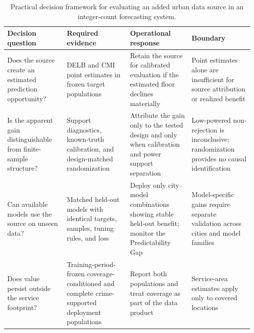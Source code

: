 \begin{table}[!htbp]
\caption{Practical decision framework for evaluating an added urban data
source in an integer-count forecasting system.}
\label{tab:practical_decision_framework}
\centering
\setlength{\tabcolsep}{3.5pt}
\begin{tabularx}{\textwidth}{
>{\RaggedRight\arraybackslash}p{2.75cm}
>{\RaggedRight\arraybackslash}X
>{\RaggedRight\arraybackslash}X
>{\RaggedRight\arraybackslash}p{3.15cm}}
\toprule
\textbf{Decision question} & \textbf{Required evidence} &
\textbf{Operational response} & \textbf{Boundary}\\
\midrule
Does the source create an estimated prediction opportunity? &
DELB and CMI point estimates in frozen target populations &
Retain the source for calibrated evaluation if the estimated floor
declines materially & Point estimates alone are insufficient for
source attribution or realized benefit\\
Is the apparent gain distinguishable from finite-sample structure? &
Support diagnostics, known-truth calibration, and design-matched
randomization & Attribute the gain only to the tested design and only when
calibration and power support separation & Low-powered non-rejection is
inconclusive; randomization provides no causal identification\\
Can available models use the source on unseen data? &
Matched held-out models with identical targets, samples, tuning rules, and
loss & Deploy only city--model combinations showing stable held-out benefit;
monitor the Predictability Gap & Model-specific gains require separate
validation across cities and model families\\
Does value persist outside the service footprint? &
Training-period-frozen coverage-conditioned and complete crime-supported
deployment populations &
Report both populations and treat coverage as part of the data product &
Service-area estimates apply only to covered locations\\
\bottomrule
\end{tabularx}
\end{table}
